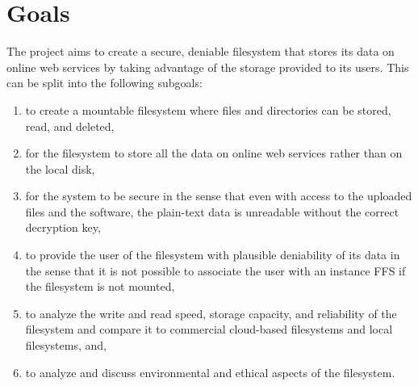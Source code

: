 
\section{Goals}


The project aims to create a secure, deniable filesystem that stores its data on online web services by taking advantage of the storage provided to its users. This can be split into the following subgoals:
\begin{enumerate}
\item to create a mountable filesystem where files and directories can be stored, read, and deleted,
\item for the filesystem to store all the data on online web services rather than on the local disk,
\item for the system to be secure in the sense that even with access to the uploaded files and the software, the \mbox{plain-text} data is unreadable without the correct decryption key, 
\item to provide the user of the filesystem with plausible deniability of its data in the sense that it is not possible to associate the user with an instance \gls{FFS} if the filesystem is not mounted,
\item to analyze the write and read speed, storage capacity, and reliability of the filesystem and compare it to commercial \mbox{cloud-based} filesystems and local filesystems, and,
\item to analyze and discuss environmental and ethical aspects of the filesystem.
\end{enumerate}


